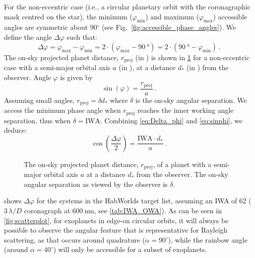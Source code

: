 \documentclass[
    usenatbib,
]{mnras}
\newcommand{\hwo}{HabWorlds}
\begin{document}
For the non-eccentric case (i.e., a circular planetary orbit with the coronagraphic mask centred on the star), the minimum ($\varphi_\mathrm{min}$) and maximum ($\varphi_\mathrm{max}$) accessible angles are symmetric about 90$^\circ$ (see Fig.~\ref{fig:accessible_phase_angles}). 
%
We define the angle $\Delta \varphi$ such that: 
\begin{equation}
 \label{eq:Delta_phi}
    \Delta \varphi 
    = \varphi_\mathrm{max} - \varphi_\mathrm{min}
    =  2 \cdot (\varphi_\mathrm{max} - \qty{90}{\degree}) 
    =  2 \cdot (\qty{90}{\degree} - \varphi_\mathrm{min} )  \,.
\end{equation} 
The on-sky projected planet distance, $r_\mathrm{proj}$ (in \unit{\au}) is shown in \cref{fig:scattering-angle} for a non-eccentric case with a 
semi-major orbital axis $a$ (in \unit{\au}), at a distance $d_*$ (in \unit{\parsec}) from the observer. 
%
Angle $\varphi$ is given by
\begin{equation}
    \sin(\varphi) = \frac{r_\mathrm{proj}}{a} \,.
    \label{eq:sinphi}
\end{equation}
%
Assuming small angles, $r_\mathrm{proj} = \delta d_*$ where $\delta$ is the on-sky angular separation.
%
We access the minimum phase angle when $r_\mathrm{proj}$ reaches the inner working angle separation, thus when $\delta = \mathrm{IWA}$. 
%
Combining \cref{eq:Delta_phi} and \cref{eq:sinphi}, we deduce:
%
\begin{equation}
    \label{eq:scattering_angle}
    \cos\left(\dfrac{\Delta \varphi}{2}\right) = \frac{\mathrm{IWA} 
    \cdot d_*}{a} \,.
\end{equation}

\begin{figure}
    \centering
    
    \caption{
        The on-sky projected planet distance, $r_\mathrm{proj}$, of a planet with a semi-major orbital axis $a$ at a distance $d_*$ from the observer.
        The on-sky angular separation as viewed by the observer is $\delta$.
    }
    \label{fig:scattering-angle}
\end{figure}

 shows $\Delta \varphi$ for the systems in the \hwo{} target list, assuming an IWA of \qty{62}{\mas} ($3\,\lambda / D$ coronagraph at $\qty{600}{\nano\meter}$, see \cref{tab:IWA_OWA}). 
%
%
As can be seen in \cref{fig:scatterplot}, for exoplanets in edge-on circular orbits, it will always be possible to observe the angular feature that is representative for Rayleigh scattering, as that occurs around quadrature ($\alpha=90^\circ$), while the rainbow angle (around $\alpha=40^\circ$) will only be accessible for a subset of exoplanets.
\end{document}
